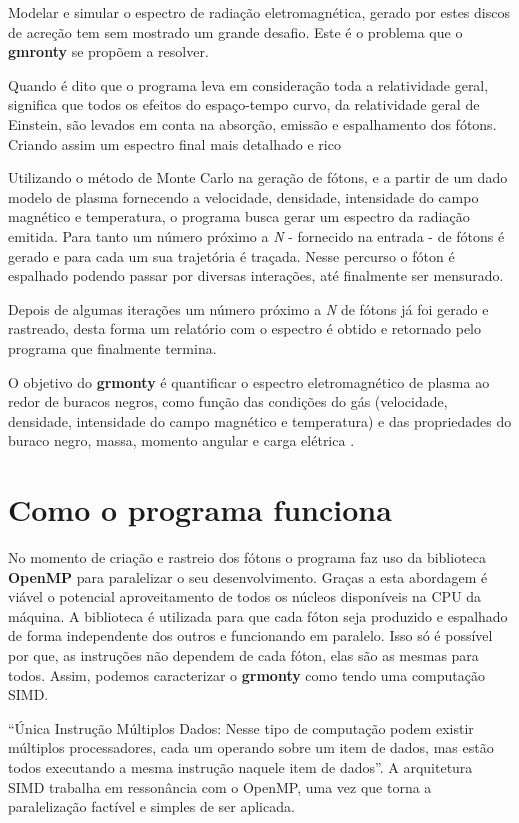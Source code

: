   Modelar e simular o espectro de radiação eletromagnética, gerado por estes discos de acreção tem sem mostrado um grande desafio. Este é o problema que o \textbf{gmronty} se propõem a resolver.

  Quando é dito que o programa leva em consideração toda a relatividade geral, significa que todos os efeitos do espaço-tempo curvo, da relatividade geral de Einstein, são levados em conta na absorção, emissão e espalhamento dos fótons. Criando assim um  espectro final mais detalhado e rico  \cite{Dolence:09}

  Utilizando o método de Monte Carlo na geração de fótons, e a partir de um dado modelo de plasma fornecendo a velocidade, densidade, intensidade do campo magnético e temperatura, o programa busca gerar um espectro da radiação emitida. Para tanto um número próximo a \textit{N} - fornecido na entrada - de fótons é gerado e para cada um sua trajetória é traçada. Nesse percurso o fóton é espalhado podendo passar por diversas interações, até finalmente ser mensurado.

  Depois de algumas iterações um número próximo a \textit{N} de fótons já foi gerado e rastreado, desta forma um relatório com o espectro é obtido e retornado pelo programa que finalmente termina.

  O objetivo do \textbf{grmonty} é quantificar  o espectro eletromagnético de plasma ao redor de buracos negros, como função das condições do gás (velocidade, densidade,  intensidade do campo magnético e temperatura) e das propriedades do buraco negro, massa, momento angular e carga elétrica \cite{Dolence:09}.


\section{Como o programa funciona}
\label{sec:comofaz}

  No momento de criação e rastreio dos fótons o programa faz uso da biblioteca \textbf{OpenMP} para paralelizar o seu desenvolvimento. Graças a esta abordagem é viável o potencial aproveitamento de todos os núcleos disponíveis na CPU da máquina. A biblioteca é utilizada para que cada fóton seja produzido e espalhado de forma independente dos outros e funcionando em paralelo. Isso só é possível por que, as instruções não dependem de cada fóton, elas são as mesmas para todos. Assim, podemos caracterizar o \textbf{grmonty} como tendo uma computação SIMD.

  ``Única Instrução Múltiplos Dados: Nesse tipo de computação podem existir múltiplos processadores, cada um operando sobre um item de dados, mas estão todos executando a mesma instrução naquele item de dados''\citep[p.84, traduzido]{HCP:16}. A arquitetura SIMD trabalha em ressonância com o OpenMP, uma vez que torna a paralelização factível e simples de ser aplicada.
  
